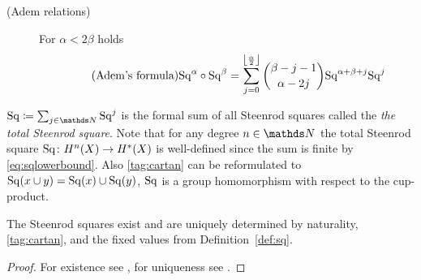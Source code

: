 \begin{Def}
\begin{description}
  \item[(Adem relations)] For $\alpha<2\beta$ holds
    \begin{gather}\label{tag:adem}\tag{Adem's formula}
      \mathrm{Sq}^{\alpha} \circ \mathrm{Sq}^{\beta} =
      \sum_{j=0}^{\left\lfloor \frac \alpha 2 \right\rfloor}
      \binom{\beta-j-1}{\alpha-2j}
      \mathrm{Sq}^{\alpha+\beta+j}\mathrm{Sq}^{j}
    \end{gather}
  \end{description}
  $\SQ\coloneqq \sum_{j\in\Nat}\Sq j$ is the formal sum of all
  Steenrod squares called the \emph{the total Steenrod square}.
  Note that for any degree $n\in\Nat$ the total Steenrod square
  $\mathrm{Sq}\colon H^n(X)\to H^*(X)$ is well-defined since the sum is
  finite by \eqref{eq:sqlowerbound}.
  Also \ref{tag:cartan} can be reformulated to
  $\mathrm{Sq}(x\cup y) = \mathrm{Sq}(x)\cup\mathrm{Sq}(y)$, \idest $\mathrm{Sq}$ is a group
  homomorphism with respect to the cup-product.
\end{Def}

\begin{Thm}
  The Steenrod squares exist and are uniquely determined by
  naturality, \ref{tag:cartan}, and the fixed values
  from Definition~\autoref{def:sq}.
  \begin{proof}
    For existence see \cite[Chapter 2]{mosher},
    for uniqueness see \cite[VIII §3]{steenrodepstein}.
  \end{proof}
\end{Thm}

